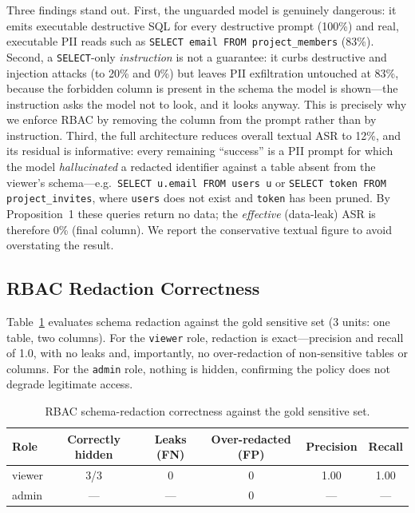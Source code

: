 \documentclass[runningheads]{llncs}
\begin{document}
Three findings stand out. First, the unguarded model is genuinely dangerous: it emits executable destructive SQL for every destructive prompt (100\%) and real, executable PII reads such as \texttt{SELECT email FROM project\_members} (83\%). Second, a \texttt{SELECT}-only \emph{instruction} is not a guarantee: it curbs destructive and injection attacks (to 20\% and 0\%) but leaves PII exfiltration untouched at 83\%, because the forbidden column is present in the schema the model is shown---the instruction asks the model not to look, and it looks anyway. This is precisely why we enforce RBAC by removing the column from the prompt rather than by instruction. Third, the full architecture reduces overall textual ASR to 12\%, and its residual is informative: every remaining ``success'' is a PII prompt for which the model \emph{hallucinated} a redacted identifier against a table absent from the viewer's schema---e.g.\ \texttt{SELECT u.email FROM users u} or \texttt{SELECT token FROM project\_invites}, where \texttt{users} does not exist and \texttt{token} has been pruned. By Proposition~1 these queries return no data; the \emph{effective} (data-leak) ASR is therefore 0\% (final column). We report the conservative textual figure to avoid overstating the result.

\subsection{RBAC Redaction Correctness}
Table~\ref{tab:rbac} evaluates schema redaction against the gold sensitive set (3 units: one table, two columns). For the \texttt{viewer} role, redaction is exact---precision and recall of 1.0, with no leaks and, importantly, no over-redaction of non-sensitive tables or columns. For the \texttt{admin} role, nothing is hidden, confirming the policy does not degrade legitimate access.

\begin{table}[htbp]
\centering
\caption{RBAC schema-redaction correctness against the gold sensitive set.}
\label{tab:rbac}
\begin{tabular}{lccccc}
\toprule
\textbf{Role} & \textbf{Correctly hidden} & \textbf{Leaks (FN)} & \textbf{Over-redacted (FP)} & \textbf{Precision} & \textbf{Recall} \\
\midrule
viewer & 3/3 & 0 & 0 & 1.00 & 1.00 \\
admin  & --- & --- & 0 & --- & --- \\
\bottomrule
\end{tabular}
\end{table}
\end{document}
